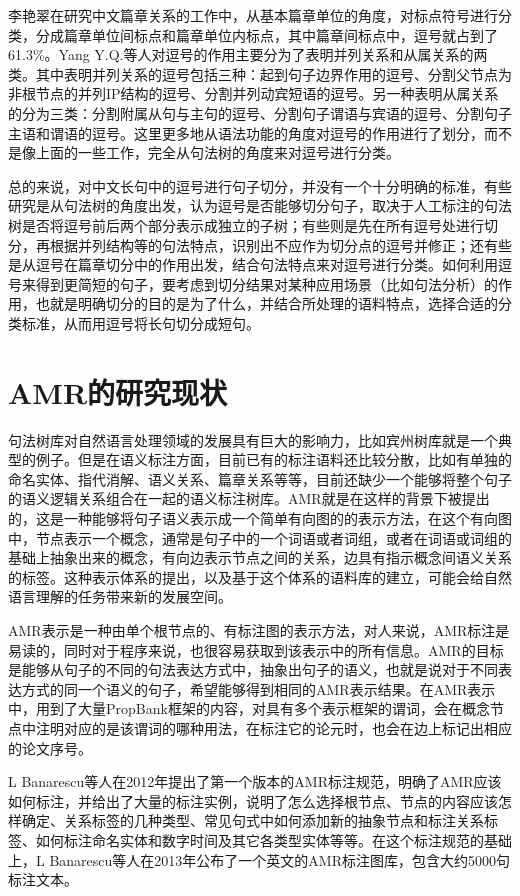 \documentclass[master, winfont]{njuthesis}
\begin{document}
李艳翠\cite{liyancui2015}在研究中文篇章关系的工作中，从基本篇章单位的角度，对标点符号进行分类，分成篇章单位间标点和篇章单位内标点，其中篇章间标点中，逗号就占到了61.3\%。Yang Y.Q.等人\cite{Yang2012Chinese}对逗号的作用主要分为了表明并列关系和从属关系的两类。其中表明并列关系的逗号包括三种：起到句子边界作用的逗号、分割父节点为非根节点的并列IP结构的逗号、分割并列动宾短语的逗号。另一种表明从属关系的分为三类：分割附属从句与主句的逗号、分割句子谓语与宾语的逗号、分割句子主语和谓语的逗号。这里更多地从语法功能的角度对逗号的作用进行了划分，而不是像上面的一些工作，完全从句法树的角度来对逗号进行分类。

总的来说，对中文长句中的逗号进行句子切分，并没有一个十分明确的标准，有些研究是从句法树的角度出发，认为逗号是否能够切分句子，取决于人工标注的句法树是否将逗号前后两个部分表示成独立的子树；有些则是先在所有逗号处进行切分，再根据并列结构等的句法特点，识别出不应作为切分点的逗号并修正；还有些是从逗号在篇章切分中的作用出发，结合句法特点来对逗号进行分类。如何利用逗号来得到更简短的句子，要考虑到切分结果对某种应用场景（比如句法分析）的作用，也就是明确切分的目的是为了什么，并结合所处理的语料特点，选择合适的分类标准，从而用逗号将长句切分成短句。

\section{AMR的研究现状}
句法树库对自然语言处理领域的发展具有巨大的影响力，比如宾州树库就是一个典型的例子。但是在语义标注方面，目前已有的标注语料还比较分散，比如有单独的命名实体、指代消解、语义关系、篇章关系等等，目前还缺少一个能够将整个句子的语义逻辑关系组合在一起的语义标注树库。AMR就是在这样的背景下被提出的，这是一种能够将句子语义表示成一个简单有向图的的表示方法，在这个有向图中，节点表示一个概念，通常是句子中的一个词语或者词组，或者在词语或词组的基础上抽象出来的概念，有向边表示节点之间的关系，边具有指示概念间语义关系的标签。这种表示体系的提出，以及基于这个体系的语料库的建立，可能会给自然语言理解的任务带来新的发展空间。

AMR表示是一种由单个根节点的、有标注图的表示方法\cite{Banarescu2013Abstract}，对人来说，AMR标注是易读的，同时对于程序来说，也很容易获取到该表示中的所有信息。AMR的目标是能够从句子的不同的句法表达方式中，抽象出句子的语义，也就是说对于不同表达方式的同一个语义的句子，希望能够得到相同的AMR表示结果。在AMR表示中，用到了大量PropBank框架的内容，对具有多个表示框架的谓词，会在概念节点中注明对应的是该谓词的哪种用法，在标注它的论元时，也会在边上标记出相应的论文序号。

L Banarescu等人\cite{banarescu2012abstract}在2012年提出了第一个版本的AMR标注规范，明确了AMR应该如何标注，并给出了大量的标注实例，说明了怎么选择根节点、节点的内容应该怎样确定、关系标签的几种类型、常见句式中如何添加新的抽象节点和标注关系标签、如何标注命名实体和数字时间及其它各类型实体等等。在这个标注规范的基础上，L Banarescu等人\cite{Banarescu2013Abstract}在2013年公布了一个英文的AMR标注图库，包含大约5000句标注文本。
\end{document}
